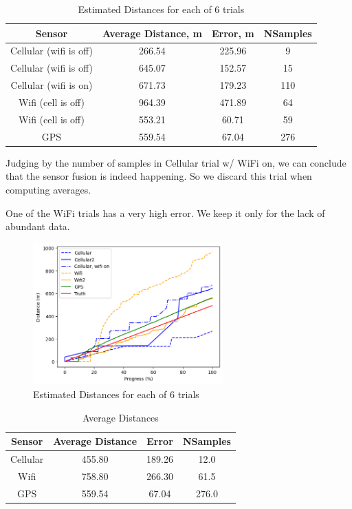 \documentclass{lab}
\begin{document}
\begin{table}[h!]
    \centering
    \begin{tabular}{|c|c|c|c|}
        \hline
        \textbf{Sensor} & \textbf{Average Distance, m} & \textbf{Error, m} & \textbf{NSamples} \\ \hline
        Cellular (wifi is off) & 266.54 & 225.96 & 9 \\ \hline
        Cellular (wifi is off) & 645.07 & 152.57 & 15 \\ \hline
        Cellular (wifi is on) & 671.73 & 179.23 & 110 \\ \hline
        Wifi (cell is off) & 964.39 & 471.89 & 64 \\ \hline
        Wifi (cell is off) & 553.21 & 60.71 & 59 \\ \hline
        GPS & 559.54 & 67.04 & 276 \\ \hline
    \end{tabular}
    \caption{Estimated Distances for each of 6 trials}
    \label{tab:distances}
\end{table}

Judging by the number of samples in Cellular trial w/ WiFi on, we can conclude that the sensor fusion is indeed happening. So we discard this trial when computing averages.

One of the WiFi trials has a very high error. We keep it only for the lack of abundant data.


\begin{figure}[h]
\begin{center}
\includegraphics[width=0.65\textwidth]{images/distances.png} 
\caption{Estimated Distances for each of 6 trials}
\end{center}  
\end{figure}

\begin{table}[h!]
  \centering
  \begin{tabular}{|c|c|c|c|}
      \hline
      \textbf{Sensor} & \textbf{Average Distance} & \textbf{Error} & \textbf{NSamples} \\ \hline
      Cellular & 455.80 & 189.26 & 12.0 \\ \hline
      Wifi & 758.80 & 266.30 & 61.5 \\ \hline
      GPS & 559.54 & 67.04 & 276.0 \\ \hline
  \end{tabular}
  \caption{Average Distances}
  \label{tab:averages}
\end{table}
\end{document}
